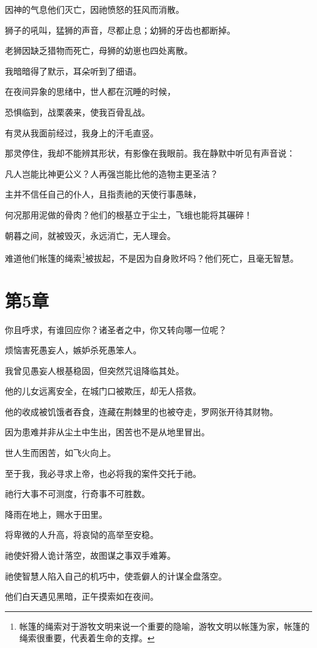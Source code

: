 \documentclass[12pt,oneside]{book}
\begin{document}
因神的气息他们灭亡，因祂愤怒的狂风而消散。

狮子的吼叫，猛狮的声音，尽都止息；幼狮的牙齿也都断掉。

老狮因缺乏猎物而死亡，母狮的幼崽也四处离散。

我暗暗得了默示，耳朵听到了细语。

在夜间异象的思绪中，世人都在沉睡的时候，

恐惧临到，战栗袭来，使我百骨乱战。

有灵从我面前经过，我身上的汗毛直竖。

那灵停住，我却不能辨其形状，有影像在我眼前。我在静默中听见有声音说：

凡人岂能比神更公义？人再强岂能比他的造物主更圣洁？

主并不信任自己的仆人，且指责祂的天使行事愚昧，

何况那用泥做的骨肉？他们的根基立于尘土，飞蛾也能将其碾碎！

朝暮之间，就被毁灭，永远消亡，无人理会。

难道他们帐篷的绳索\footnote{帐篷的绳索对于游牧文明来说一个重要的隐喻，游牧文明以帐篷为家，帐篷的绳索很重要，代表着生命的支撑。}被拔起，不是因为自身败坏吗？他们死亡，且毫无智慧。


\chapter{第5章}
你且呼求，有谁回应你？诸圣者之中，你又转向哪一位呢？

烦恼害死愚妄人，嫉妒杀死愚笨人。

我曾见愚妄人根基稳固，但突然咒诅降临其处。

他的儿女远离安全，在城门口被欺压，却无人搭救。

他的收成被饥饿者吞食，连藏在荆棘里的也被夺走，罗网张开待其财物。

因为患难并非从尘土中生出，困苦也不是从地里冒出。

世人生而困苦，如飞火向上。

至于我，我必寻求上帝，也必将我的案件交托于祂。

祂行大事不可测度，行奇事不可胜数。

降雨在地上，赐水于田里。

将卑微的人升高，将哀恸的高举至安稳。

祂使奸猾人诡计落空，故图谋之事双手难筹。

祂使智慧人陷入自己的机巧中，使乖僻人的计谋全盘落空。

他们白天遇见黑暗，正午摸索如在夜间。
\end{document}
